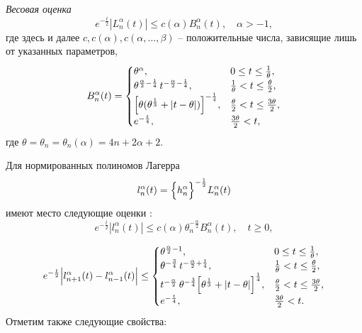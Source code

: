 \textit{Весовая оценка} \cite{sob-lag-smj-AskeyWaiger}
\begin{equation}\label{sob-lag-smj-2.10}
e^{-\frac{t}{2}}|L_n^\alpha(t)| \le c(\alpha) B_n^\alpha(t), \quad \alpha>-1,
\end{equation}
где здесь и далее $c,c(\alpha),c(\alpha,\ldots,\beta)$ -- положительные числа, зависящие лишь от указанных параметров,
\begin{equation*}\label{sob-lag-smj-2.11}
B_n^\alpha(t)=
\begin{cases}
\theta^\alpha, &0 \le t \le \frac{1}{\theta},\\
\theta^{\frac{\alpha}{2} - \frac{1}{4}}\,t^{-\frac{\alpha}{2} - \frac{1}{4}}, & \frac{1}{\theta} < t \le \frac{\theta}{2},\\
\Bigl[
\theta(\theta^{\frac{1}{3}}+|t-\theta|)
\Bigr]^{-\frac{1}{4}}, & \frac{\theta}{2} < t \le \frac{3\theta}{2},\\
e^{-\frac{t}{4}}, &\frac{3\theta}{2}< t,
\end{cases}
\end{equation*}
где $\theta=\theta_n=\theta_n(\alpha)=4n+2\alpha+2$.

Для нормированных полиномов Лагерра
\begin{equation}\label{sob-lag-smj-2.12}
l_n^\alpha(t)=
\Bigl\{h_n^\alpha \Bigr\}^{-\frac{1}{2}} L_n^\alpha(t)
\end{equation}
имеют место следующие оценки \cite{sob-lag-smj-AskeyWaiger}:
\begin{equation*}\label{sob-lag-smj-2.13}
e^{-\frac{t}{2}}
|l_n^\alpha(t)|\le
c(\alpha)\theta_n^{-\frac{\alpha}{2}}B_n^\alpha(t), \quad t \ge 0,
\end{equation*}

\begin{equation*}\label{sob-lag-smj-2.14}
e^{-\frac{t}{2}}
\Bigl|
l_{n+1}^\alpha(t)-
l_{n-1}^\alpha(t)
\Bigr|\le
\begin{cases}
\theta^{\frac{\alpha}{2}-1}, &0 \le t \le \frac{1}{\theta},\\
\theta^{-\frac{3}{4}}\,t^{-\frac{\alpha}{2} + \frac{1}{4}}, & \frac{1}{\theta} < t \le \frac{\theta}{2},\\
t^{-\frac{\alpha}{2}}\,
\theta^{-\frac{3}{4}}
\Bigl[
\theta^{\frac{1}{3}}+|t-\theta|
\Bigr]^{\frac{1}{4}}, & \frac{\theta}{2} < t \le \frac{3\theta}{2},\\
e^{-\frac{t}{4}}, &\frac{3\theta}{2}< t.
\end{cases}
\end{equation*}
Отметим также следующие свойства:

